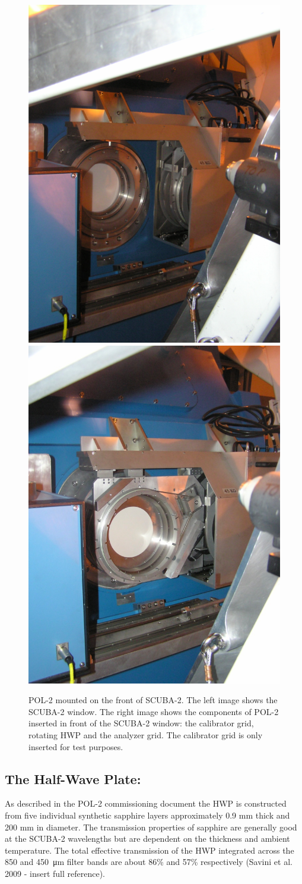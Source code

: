 \begin{figure}[t!]
\begin{center}
\includegraphics[width=0.45\linewidth]{pol2-out-of-beam.png}
\includegraphics[width=0.45\linewidth]{pol2-in-beam.png}
\label{fig:pol2sc2}
\caption [POL-2 mounted on SCUBA-2]{
  \small POL-2 mounted on the front of SCUBA-2.
  The left image shows the SCUBA-2
  window. The right image shows the components of POL-2 inserted
  in front of the SCUBA-2 window: the calibrator grid, rotating HWP
  and the analyzer grid. The calibrator grid is only inserted
  for test purposes.
}
\end{center}
\end{figure}




\subsection*{The Half-Wave Plate:}

As described in the POL-2 commissioning document
the HWP is constructed from five individual synthetic sapphire layers approximately 0.9
mm thick and 200 mm in diameter. The transmission properties of sapphire
are generally good at the SCUBA-2 wavelengths but are dependent on the thickness and ambient
temperature. The total effective transmission of the HWP integrated across the 850
and \SI{450}{\micro\metre} filter bands are about 86\% and 57\% respectively
(Savini et al. 2009 - insert full reference).


